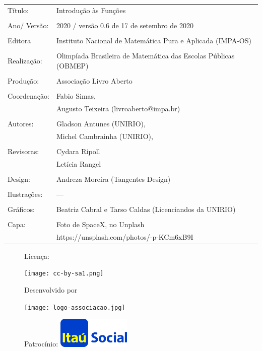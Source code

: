 \begin{tabular}{p{}p{}}
Título: & Introdução às Funções\\
\\
Ano/ Versão: & 2020 / versão 0.6 de 17 de setembro de 2020\\
\\
Editora & Instituto Nacional de Matem\'atica Pura e Aplicada (IMPA-OS)\\
\\
Realização:& Olimp\'iada Brasileira de Matem\'atica das Escolas P\'ublicas (OBMEP)\\
\\
Produção:& Associação Livro Aberto\\
\\
Coordenação:& Fabio Simas, \\
			& Augusto Teixeira (livroaberto@impa.br)\\
\\
  Autores: & Gladson Antunes (UNIRIO),\\
        & Michel Cambrainha (UNIRIO),\\
           
\\
Revisoras: &  Cydara Ripoll  \\
                &  Letícia Rangel \\
\\
Design: & Andreza Moreira (Tangentes Design) \\
\\
  Ilustrações: & --- \\ 
\\
Gráficos: & Beatriz Cabral e Tarso Caldas (Licenciandos da UNIRIO)\\
\\
  Capa: & Foto de SpaceX, no Unplash \\
  		& https://unsplash.com/photos/-p-KCm6xB9I
\end{tabular}
\vspace{.5cm}


\begin{figure}[b]
\begin{minipage}[l]{5cm}
\centering

{\large Licença:}

  \texttt{[image: cc-by-sa1.png]}
\end{minipage}\hfill
\begin{minipage}[c]{5cm}
\centering
{\large Desenvolvido por}

\texttt{[image: logo-associacao.jpg]}
\end{minipage}
\begin{minipage}[r]{5cm}
\centering

{\large Patrocínio:}
  \vspace{1em}
  \includegraphics[width=3.5cm]{itau}
\end{minipage}
\end{figure}

